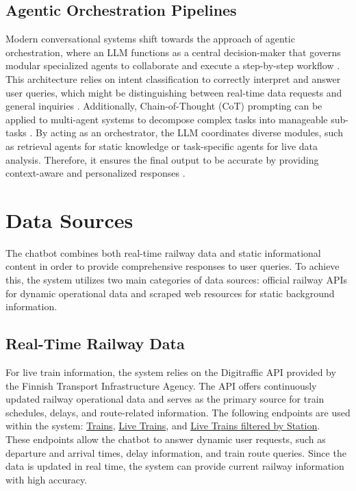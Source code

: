 \documentclass[fleqn,moreauthors,10pt]{ds_report}
\begin{document}
\subsection*{Agentic Orchestration Pipelines}
Modern conversational systems shift towards the approach of agentic orchestration, where an LLM functions as a central decision-maker that governs modular specialized agents to collaborate and execute a step-by-step workflow \cite{fantin_design_2025}. This architecture relies on intent classification to correctly interpret and answer user queries, which might be distinguishing between real-time data requests and general inquiries \cite{sufi_ai-driven_2025, wang_traffic_2024}. Additionally, Chain-of-Thought (CoT) prompting can be applied to multi-agent systems to decompose complex tasks into manageable sub-tasks \cite{wang_traffic_2024}. By acting as an orchestrator, the LLM coordinates diverse modules, such as retrieval agents for static knowledge or task-specific agents for live data analysis. Therefore, it ensures the final output to be accurate by providing context-aware and personalized responses \cite{fantin_design_2025, xu_genai-powered_2024}.

%



\section*{Data Sources}

The chatbot combines both real-time railway data and static informational content in order to provide comprehensive responses to user queries. To achieve this, the system utilizes two main categories of data sources: official railway APIs for dynamic operational data and scraped web resources for static background information.

\subsection*{Real-Time Railway Data}

For live train information, the system relies on the Digitraffic API provided by the Finnish Transport Infrastructure Agency. The API offers continuously updated railway operational data and serves as the primary source for train schedules, delays, and route-related information. The following endpoints are used within the system: \href{https://rata.digitraffic.fi/api/v1/trains}{Trains}, \href{https://rata.digitraffic.fi/api/v1/live-trains}{Live Trains}, and \href{https://rata.digitraffic.fi/api/v1/live-trains/station}{Live Trains filtered by Station}. \\
These endpoints allow the chatbot to answer dynamic user requests, such as departure and arrival times, delay information, and train route queries. Since the data is updated in real time, the system can provide current railway information with high accuracy.
\end{document}
